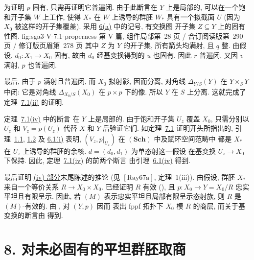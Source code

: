 为证明 \(p\) 固有, 只需再证明它普遍闭.
由于此断言在 \(Y\) 上是局部的, 可以在一个饱和开子集 \(W\) 上工作,
使得 \(X_\ast\) 在 \(W\) 上诱导的群胚
\(W_\ast\) 具有一个拟截面 \(U\)
(因为 \(X_0\) 被这样的开子集覆盖). 采用
\hyperref[par:sga3-V-6-a]{6(a)} 中的记号, 有交换图
  {开子集 \(Z\subseteq Y\) 上的固有性图.}
  {fig:sga3-V-7.1-properness}
  {第 V 篇, 组件局部第~28 页 / 合订阅读版第~290 页 / 修订版页眉第~278 页}
其中 \(Z\) 为 \(Y\) 的开子集, 所有箭头均满射,
且 \(q\) 整. 由假设,
\(d_0:X_1\to X_0\) 固有, 故由 \(d_0\)
经基变换得到的 \(u\) 也固有. 因此 \(r\) 普遍闭,
又因 \(v\) 满射, \(p\) 也普遍闭.

最后, 由于 \(p\) 满射且普遍闭, 而
\(X_0\) 拟射影, 因而分离, 对角线
\(\Delta_{Y/S}(Y)\) 在 \(Y\times_S Y\) 中闭:
它是对角线 \(\Delta_{X_0/S}(X_0)\) 在
\(p\times p\) 下的像. 所以 \(Y\) 在 \(S\) 上分离.
这就完成了定理~\hyperref[thm:sga3-V-7.1-ii]{7.1(ii)} 的证明.

定理~\hyperref[thm:sga3-V-7.1-iv]{7.1(iv)} 中的断言
在 \(Y\) 上是局部的. 由于饱和开子集 \(U_z\) 覆盖
\(X_0\), 只需分别以 \(U_z\) 和 \(V_z=p(U_z)\)
代替 \(X\) 和 \(Y\) 后验证它们. 如定理~\hyperref[thm:sga3-V-7.1]{7.1}
证明开头所指出的, 引理~\hyperref[lem:sga3-V-1.1]{1.1},
\hyperref[sga3:exp5:lemma:1.2]{1.2} 及
\hyperref[lem:sga3-V-6.1-i]{6.1(i)} 表明,
\((V_z,p|_{U_z})\) 在 \((\mathbf{Sch})\) 中及赋环空间范畴中
都是 \(X_\ast\) 在 \(U_z\) 上诱导的群胚的余核.
\(d=(d_0,d_1)\) 为单态射这一假设
在基变换 \(U_z\to X_0\) 下保持.
因此, 定理~\hyperref[thm:sga3-V-7.1-iv]{7.1(iv)} 的前两个断言
由引理~\hyperref[lem:sga3-V-6.1-iv]{6.1(iv)} 得到.

最后证明 \hyperref[thm:sga3-V-7.1-iv]{(iv) 部分}末尾陈述的推论
(见 \(\hyperref[bib:sga3-V-Ray67a]{[\mathrm{Ray67a}]}\), 定理~1(iii)). 由假设,
群胚 \(X_\ast\) 来自一个等价关系
\(R\to X_0\times X_0\). 已经证明 \(R\) 有效
(), 且
\(p:X_0\to Y=X_0/R\) 忠实平坦且有限呈示.
因此, 若 \((M)\) 表示忠实平坦且局部有限呈示态射族,
则 \(R\) 是
\((M)\)-有效的. 由
, 对 \((Y,p)\) 因而
表出 fppf 拓扑下 \(X_0\) 模 \(R\) 的商层,
而关于基变换的断言由
 得到.

\section*{8. 对未必固有的平坦群胚取商}
\label{sec:sga3-V-8}

